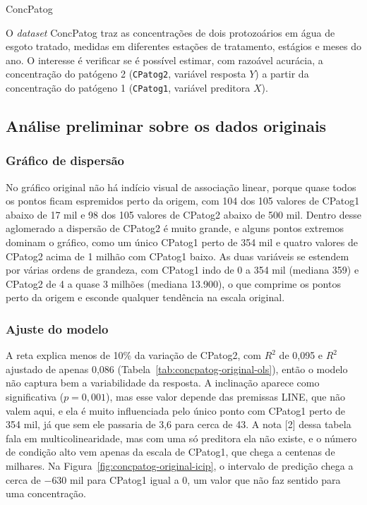 \begin{dataset}{ConcPatog}

O \textit{dataset} ConcPatog traz as concentrações de dois protozoários em água de esgoto tratado, medidas em diferentes estações de tratamento, estágios e meses do ano. O interesse é verificar se é possível estimar, com razoável acurácia, a concentração do patógeno 2 (\texttt{CPatog2}, variável resposta $Y$) a partir da concentração do patógeno 1 (\texttt{CPatog1}, variável preditora $X$).

\subsection{Análise preliminar sobre os dados originais}

\subsubsection{Gráfico de dispersão}


No gráfico original não há indício visual de associação linear, porque quase todos os pontos ficam espremidos perto da origem, com 104 dos 105 valores de CPatog1 abaixo de 17 mil e 98 dos 105 valores de CPatog2 abaixo de 500 mil. Dentro desse aglomerado a dispersão de CPatog2 é muito grande, e alguns pontos extremos dominam o gráfico, como um único CPatog1 perto de 354 mil e quatro valores de CPatog2 acima de 1 milhão com CPatog1 baixo. As duas variáveis se estendem por várias ordens de grandeza, com CPatog1 indo de 0 a 354 mil (mediana 359) e CPatog2 de 4 a quase 3 milhões (mediana 13.900), o que comprime os pontos perto da origem e esconde qualquer tendência na escala original.

\subsubsection{Ajuste do modelo}


A reta explica menos de 10\% da variação de CPatog2, com $R^2$ de 0,095 e $R^2$ ajustado de apenas 0,086 (Tabela~\ref{tab:concpatog-original-ols}), então o modelo não captura bem a variabilidade da resposta. A inclinação aparece como significativa ($p = 0{,}001$), mas esse valor depende das premissas LINE, que não valem aqui, e ela é muito influenciada pelo único ponto com CPatog1 perto de 354 mil, já que sem ele passaria de 3,6 para cerca de 43. A nota [2] dessa tabela fala em multicolinearidade, mas com uma só preditora ela não existe, e o número de condição alto vem apenas da escala de CPatog1, que chega a centenas de milhares. Na Figura~\ref{fig:concpatog-original-icip}, o intervalo de predição chega a cerca de $-630$ mil para CPatog1 igual a 0, um valor que não faz sentido para uma concentração.


\end{dataset}

